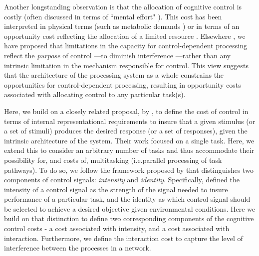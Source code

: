 \documentclass[10pt,letterpaper]{article}
\begin{document}
Another longstanding observation is that the allocation of cognitive control is costly (often discussed in terms of ``mental effort" \cite{posnerr, Botvinick_Braver_2015, Shenav_PrePrint_ARP}). This cost has been interpreted in physical terms (such as metabolic demands \cite{muraven1998self}) or in terms of an opportunity cost reflecting the allocation of a limited resource \cite{kurzban2013opportunity}. Elsewhere \cite{Feng_et_al_2014, CogSci_2016}, we have proposed that limitations in the capacity for control-dependent processing reflect the \emph{purpose} of control —to diminish interference —rather than any intrinsic limitation in the mechanism responsible for control. This view suggests that the architecture of the processing system as a whole constrains the opportunities for control-dependent processing, resulting in opportunity costs associated with allocating control to any particular task(s). 

Here, we build on a closely related proposal, by , to define the cost of control in terms of internal representational requirements to insure that a given stimulus (or a set of stimuli) produces the desired response (or a set of responses), given the intrinsic architecture of the system. Their work focused on a single task. Here, we extend this to consider an arbitrary number of tasks and thus accommodate their possibility for, and costs of, multitasking (i.e.parallel processing of task pathways). To do so, we follow the framework proposed by  that distinguishes two components of control signals: \emph{intensity} and \emph{identity}. Specifically,  defined the intensity of a control signal as the strength of the signal needed to insure performance of a particular task, and the identity as which control signal should be selected to achieve a desired objective given environmental conditions. Here we build on that distinction to define two corresponding components of the cognitive control costs - a cost associated with intensity, and a cost associated with interaction. Furthermore, we define the interaction cost to capture the level of interference between the processes in a network.
\end{document}
